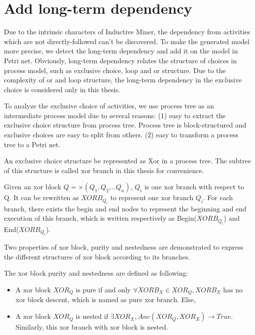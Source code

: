 \section{Add long-term dependency}
Due to the intrinsic characters of Inductive Miner, the dependency from activities which are not directly-followed can't be discovered. 
To make the generated model  more precise, we detect the long-term dependency and add it on the model in Petri net. 
Obviously, long-term dependency relates the structure of choices in process model, such as exclusive choice, loop and or structure. Due to the complexity of or and loop structure, the long-term dependency in the exclusive choice is considered only in this thesis. 

To analyze the exclusive choice of activities, we use process tree as an intermediate process model due to several reasons: (1) easy to extract the exclusive choice structure from process tree. Process tree is block-structured and exclusive choices are easy to split from others. (2) easy to transform a process tree to a Petri net. 

An exclusive choice structure be represented as Xor in a process tree. The subtree of this structure is called xor branch in this thesis for convenience.
\begin{definition}
Given an xor block $Q= \times(Q_1 , Q_2 ,.. Q_n)$, $Q_i$ is one xor branch with respect to Q. It can be rewritten as $XORB_{Q_i}$ to represent one xor branch $Q_i$. For each branch, there exists the begin and end nodes to represent the beginning and end execution of this branch, which is written respectively as Begin($XORB_{Q_i}$) and End($XORB_{Q_i}$).	
\end{definition}
Two properties of xor block, purity and nestedness are demonstrated to express the different structures of xor block according to its branches.
\begin{definition} The xor block purity and nestedness are defined as following: 
	\begin{itemize}
		\item A xor block $XOR_Q$ is pure if and only $\forall XORB_X \in XOR_Q, XORB_X $ has no xor block descent, which is named as pure xor branch. Else,
		\item A xor block $XOR_Q$ is nested if $ \exists XOR_X, Anc(XOR_Q, XOR_X) \rightarrow True  $. Similarly, this xor branch with xor block is nested.
	\end{itemize}
\end{definition}

